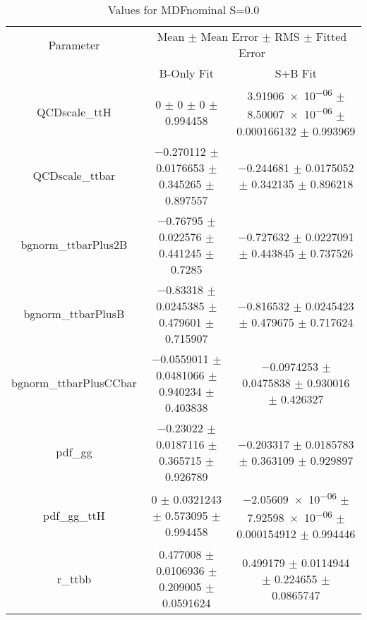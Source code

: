 \begin{table}
\centering
\caption{Values for MDFnominal S=0.0}
\begin{tabular}{ccc}
\toprule
Parameter & \multicolumn{2}{c}{Mean $\pm$ Mean Error $\pm$ RMS $\pm$ Fitted Error}\\
 & B-Only Fit & S+B Fit\\
\midrule
QCDscale\_ttH & \num{0} $\pm$ \num{0} $\pm$ \num{0} $\pm$ \num{0.994458} & \num{3.91906e-06} $\pm$ \num{8.50007e-06} $\pm$ \num{0.000166132} $\pm$ \num{0.993969}\\
QCDscale\_ttbar & \num{-0.270112} $\pm$ \num{0.0176653} $\pm$ \num{0.345265} $\pm$ \num{0.897557} & \num{-0.244681} $\pm$ \num{0.0175052} $\pm$ \num{0.342135} $\pm$ \num{0.896218}\\
bgnorm\_ttbarPlus2B & \num{-0.76795} $\pm$ \num{0.022576} $\pm$ \num{0.441245} $\pm$ \num{0.7285} & \num{-0.727632} $\pm$ \num{0.0227091} $\pm$ \num{0.443845} $\pm$ \num{0.737526}\\
bgnorm\_ttbarPlusB & \num{-0.83318} $\pm$ \num{0.0245385} $\pm$ \num{0.479601} $\pm$ \num{0.715907} & \num{-0.816532} $\pm$ \num{0.0245423} $\pm$ \num{0.479675} $\pm$ \num{0.717624}\\
bgnorm\_ttbarPlusCCbar & \num{-0.0559011} $\pm$ \num{0.0481066} $\pm$ \num{0.940234} $\pm$ \num{0.403838} & \num{-0.0974253} $\pm$ \num{0.0475838} $\pm$ \num{0.930016} $\pm$ \num{0.426327}\\
pdf\_gg & \num{-0.23022} $\pm$ \num{0.0187116} $\pm$ \num{0.365715} $\pm$ \num{0.926789} & \num{-0.203317} $\pm$ \num{0.0185783} $\pm$ \num{0.363109} $\pm$ \num{0.929897}\\
pdf\_gg\_ttH & \num{0} $\pm$ \num{0.0321243} $\pm$ \num{0.573095} $\pm$ \num{0.994458} & \num{-2.05609e-06} $\pm$ \num{7.92598e-06} $\pm$ \num{0.000154912} $\pm$ \num{0.994446}\\
r\_ttbb & \num{0.477008} $\pm$ \num{0.0106936} $\pm$ \num{0.209005} $\pm$ \num{0.0591624} & \num{0.499179} $\pm$ \num{0.0114944} $\pm$ \num{0.224655} $\pm$ \num{0.0865747}\\
\bottomrule
\end{tabular}
\end{table}